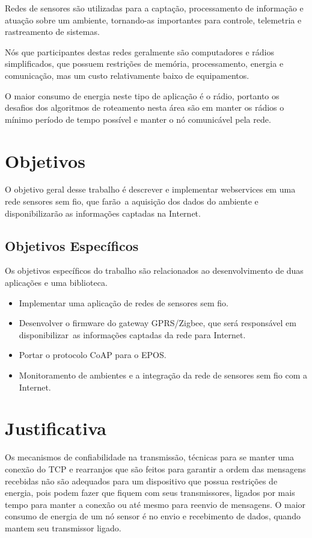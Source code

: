 Redes de sensores s\~ao utilizadas para a capta\c{c}\~ao, processamento de informa\c{c}\~ao e atua\c{c}\~ao sobre um ambiente, tornando-as importantes para controle, telemetria e rastreamento de sistemas.

N\'os que participantes destas redes geralmente s\~ao computadores e r\'adios simplificados, que possuem restri\c{c}\~oes de mem\'oria, processamento, energia e comunica\c{c}\~ao, mas um custo relativamente baixo de equipamentos.

O maior consumo de energia neste tipo de aplica\c{c}\~ao \'e o r\'adio, portanto os desafios dos algoritmos de roteamento nesta \'area s\~ao em manter os r\'adios o m\'inimo per\'iodo de tempo poss\'ivel e manter o n\'o comunic\'avel pela rede.

\section{Objetivos}
O objetivo geral desse trabalho \'e descrever e implementar webservices em uma rede sensores sem fio, que far\~ao\
a aquisi\c{c}\~ao dos dados do ambiente e disponibilizar\~ao as informa\c{c}\~oes captadas na Internet.

\subsection{Objetivos Espec\'ificos}
Os objetivos espec\'ificos do trabalho s\~ao relacionados ao desenvolvimento de duas aplica\c{c}\~oes e uma biblioteca.

\begin{itemize}
    \item Implementar uma aplica\c{c}\~ao de redes de sensores sem fio.
    \item Desenvolver o firmware do  gateway GPRS/Zigbee, que ser\'a respons\'avel em disponibilizar\
        as informa\c{c}\~oes captadas da rede para Internet.
    \item Portar o protocolo CoAP para o EPOS.
    \item Monitoramento de ambientes e a integra\c{c}\~ao da rede de sensores sem fio com a Internet.
\end{itemize}
        

\section{Justificativa}

Os mecanismos de confiabilidade na transmiss\~ao, t\'ecnicas para se manter uma conex\~ao do TCP e rearranjos que s\~ao feitos para garantir a ordem das mensagens recebidas n\~ao s\~ao adequados para um dispositivo que possua restri\c{c}\~oes de energia, pois podem fazer que fiquem com seus transmissores, ligados por mais tempo para manter a conex\~ao ou at\'e mesmo para reenvio de mensagens. O maior consumo de energia de um n\'o sensor \'e no envio e recebimento de dados, quando mantem seu transmissor ligado.

